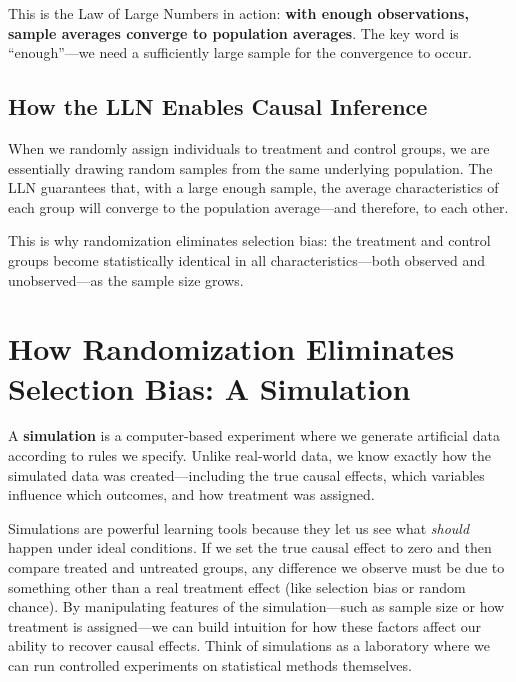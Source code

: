 \documentclass[
  letterpaper,
  DIV=11,
  numbers=noendperiod]{scrreprt}
\begin{document}
This is the Law of Large Numbers in action: \textbf{with enough
observations, sample averages converge to population averages}. The key
word is ``enough''---we need a sufficiently large sample for the
convergence to occur.

\subsection{How the LLN Enables Causal
Inference}\label{how-the-lln-enables-causal-inference}

When we randomly assign individuals to treatment and control groups, we
are essentially drawing random samples from the same underlying
population. The LLN guarantees that, with a large enough sample, the
average characteristics of each group will converge to the population
average---and therefore, to each other.

This is why randomization eliminates selection bias: the treatment and
control groups become statistically identical in all
characteristics---both observed and unobserved---as the sample size
grows.

\section{How Randomization Eliminates Selection Bias: A
Simulation}\label{how-randomization-eliminates-selection-bias-a-simulation}

\begin{tcolorbox}[enhanced jigsaw, arc=.35mm, bottomrule=.15mm, bottomtitle=1mm, breakable, colback=white, colbacktitle=quarto-callout-note-color!10!white, colframe=quarto-callout-note-color-frame, coltitle=black, left=2mm, leftrule=.75mm, opacityback=0, opacitybacktitle=0.6, rightrule=.15mm, title=\textcolor{quarto-callout-note-color}{\faInfo}\hspace{0.5em}{What is a Simulation?}, titlerule=0mm, toprule=.15mm, toptitle=1mm]

A \textbf{simulation} is a computer-based experiment where we generate
artificial data according to rules we specify. Unlike real-world data,
we know exactly how the simulated data was created---including the true
causal effects, which variables influence which outcomes, and how
treatment was assigned.

Simulations are powerful learning tools because they let us see what
\emph{should} happen under ideal conditions. If we set the true causal
effect to zero and then compare treated and untreated groups, any
difference we observe must be due to something other than a real
treatment effect (like selection bias or random chance). By manipulating
features of the simulation---such as sample size or how treatment is
assigned---we can build intuition for how these factors affect our
ability to recover causal effects. Think of simulations as a laboratory
where we can run controlled experiments on statistical methods
themselves.

\end{tcolorbox}
\end{document}
